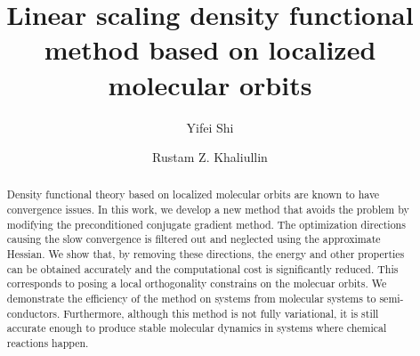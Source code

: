 \documentclass[prl,twocolumn,showpacs]{revtex4}
\begin{document}
\newcommand{\Ang}{\ensuremath{\mathring{\text{A}}}}
\newcommand{\ltwid}{\mathrel{\raise.3ex\hbox{$<$\kern-.75em\lower1ex\hbox{$\sim$}}}}
\newcommand{\gtwid}{\mathrel{\raise.3ex\hbox{$>$\kern-.75em\lower1ex\hbox{$\sim$}}}}
\newcommand{\bra}{\langle}
\newcommand{\ket}{\rangle}
\newcommand{\sill}{\psi}
\newcommand{\trace}{{\rm Tr}}
\newcommand{\ntilde}{\tilde{n}}
\newcommand{\stilde}{\tilde{s}}
\newcommand{\atilde}{\tilde{\alpha}}
\newcommand{\new}{\color{red}}
\newcommand{\old}{\color{black}}
\newcommand{\bea}{\begin{eqnarray}}
\newcommand{\eea}{\end{eqnarray}}
\def\nn{\nonumber\\}



\title{Linear scaling density functional method based on localized molecular orbits}

\author{Yifei Shi}

\author{Rustam Z. Khaliullin}


\begin{abstract}
Density functional theory based on localized molecular orbits are known to have convergence issues. In this work, we develop a new method that avoids the problem by modifying the preconditioned conjugate gradient method. The optimization directions causing the slow convergence is filtered out and neglected using the approximate Hessian. We show that, by removing these directions, the energy and other properties can be obtained accurately and the computational cost is significantly reduced. This corresponds to posing a local orthogonality constrains on the molecuar orbits. We demonstrate the efficiency of the method on systems from molecular systems to semi-conductors. Furthermore, although this method is not fully variational, it is still accurate enough to produce stable molecular dynamics in systems where chemical reactions happen.

\end{abstract}
\maketitle
\end{document}
